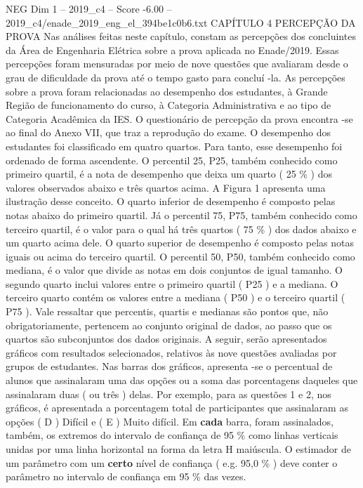 \begin{textsample}{NEG Dim 1 – 2019\_c4 – Score -6.00 – 2019\_c4/enade\_2019\_eng\_el\_394be1c0b6.txt}  \label{ex:f1_neg_081}
CAPÍTULO 4 PERCEPÇÃO DA PROVA Nas análises feitas neste capítulo, constam as percepções dos concluintes da Área de Engenharia Elétrica sobre a prova aplicada no Enade/2019.
Essas percepções foram mensuradas por meio de nove questões que avaliaram desde o grau de dificuldade da prova até o tempo gasto para concluí -la.
As percepções sobre a prova foram relacionadas ao desempenho dos estudantes, à Grande Região de funcionamento do curso, à Categoria Administrativa e ao tipo de Categoria Acadêmica da IES.
O questionário de percepção da prova encontra -se ao final do Anexo VII, que traz a reprodução do exame.
O desempenho dos estudantes foi classificado em quatro quartos.
Para tanto, esse desempenho foi ordenado de forma ascendente.
O percentil 25, P25, também conhecido como primeiro quartil, é a nota de desempenho que deixa um quarto ( 25 \% ) dos valores observados abaixo e três quartos acima.
A Figura 1 apresenta uma ilustração desse conceito.
O quarto inferior de desempenho é composto pelas notas abaixo do primeiro quartil.
Já o percentil 75, P75, também conhecido como terceiro quartil, é o valor para o qual há três quartos ( 75 \% ) dos dados abaixo e um quarto acima dele.
O quarto superior de desempenho é composto pelas notas iguais ou acima do terceiro quartil.
O percentil 50, P50, também conhecido como mediana, é o valor que divide as notas em dois conjuntos de igual tamanho.
O segundo quarto inclui valores entre o primeiro quartil ( P25 ) e a mediana.
O terceiro quarto contém os valores entre a mediana ( P50 ) e o terceiro quartil ( P75 ).
Vale ressaltar que percentis, quartis e medianas são pontos que, não obrigatoriamente, pertencem ao conjunto original de dados, ao passo que os quartos são subconjuntos dos dados originais.
A seguir, serão apresentados gráficos com resultados selecionados, relativos às nove questões avaliadas por grupos de estudantes.
Nas barras dos gráficos, apresenta -se o percentual de alunos que assinalaram uma das opções ou a soma das porcentagens daqueles que assinalaram duas ( ou três ) delas.
Por exemplo, para as questões 1 e 2, nos gráficos, é apresentada a porcentagem total de participantes que assinalaram as opções ( D ) Difícil e ( E ) Muito difícil.
Em \textbf{cada} barra, foram assinalados, também, os extremos do intervalo de confiança de 95 \% como linhas verticais unidas por uma linha horizontal na forma da letra H maiúscula.
O estimador de um parâmetro com um \textbf{certo} nível de confiança ( e.g. 95,0 \% ) deve conter o parâmetro no intervalo de confiança em 95 \% das vezes.

\end{textsample}
